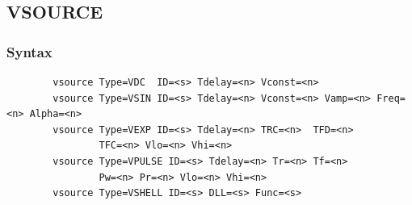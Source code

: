 \documentclass[11pt,pdftex]{article}
\begin{document}
\newpage
\subsection{VSOURCE}
\subsubsection*{Syntax}

\begin{verbatim}
        vsource Type=VDC  ID=<s> Tdelay=<n> Vconst=<n>
        vsource Type=VSIN ID=<s> Tdelay=<n> Vconst=<n> Vamp=<n> Freq=<n> Alpha=<n>
        vsource Type=VEXP ID=<s> Tdelay=<n> TRC=<n>  TFD=<n>
                TFC=<n> Vlo=<n> Vhi=<n>
        vsource Type=VPULSE ID=<s> Tdelay=<n> Tr=<n> Tf=<n>
                Pw=<n> Pr=<n> Vlo=<n> Vhi=<n>
        vsource Type=VSHELL ID=<s> DLL=<s> Func=<s>
\end{verbatim}
\end{document}
